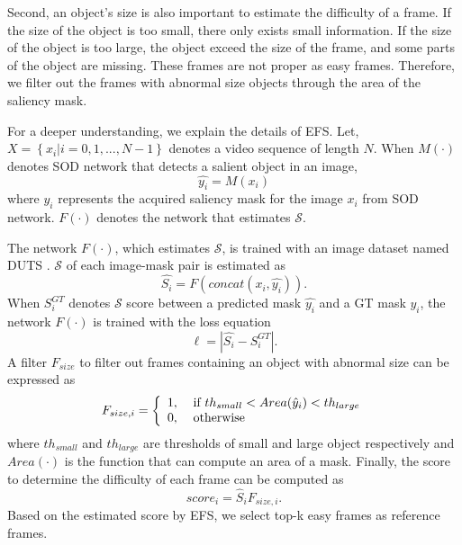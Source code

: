 \documentclass[letterpaper]{article} \usepackage{aaai22}  \usepackage{times}  \usepackage{helvet}  \usepackage{courier}  \usepackage[hyphens]{url}  \usepackage{graphicx} \urlstyle{rm} \def\UrlFont{\rm}  \usepackage{natbib}  \usepackage{caption} \DeclareCaptionStyle{ruled}{labelfont=normalfont,labelsep=colon,strut=off} \frenchspacing  \setlength{\pdfpagewidth}{8.5in}  \setlength{\pdfpageheight}{11in}  \usepackage{algorithm}
\begin{document}
Second, an object’s size is also important to estimate the difficulty of a frame. If the size of the object is too small, there only exists small information. If the size of the object is too large, the object exceed the size of the frame, and some parts of the object are missing. These frames are not proper as easy frames. Therefore, we filter out the frames with abnormal size objects through the area of the saliency mask. 

For a deeper understanding, we explain the details of EFS. Let, $X = \left\{ {{x_i}\left| {i = 0,1,...,N - 1} \right.} \right\}$ denotes a video sequence of length $N$. When $M\left(  \cdot  \right)$ denotes SOD network that detects a salient object in an image, 
\begin{equation}
    \widehat {{y_i}} = M\left( {{x_i}} \right)
    \label{equation1}
\end{equation}
where $\widehat {{y_i}}$ represents the acquired saliency mask for the image ${x_i}$ from SOD network. $F\left(  \cdot  \right)$ denotes the network that estimates $\mathcal{S}$.


The network $F\left(  \cdot  \right)$, which estimates $\mathcal{S}$, is trained with an image dataset named DUTS \citep{wang2017learning}. $\mathcal{S}$ of each image-mask pair is estimated as 
\begin{equation}
    \widehat {{S_i}} = F\left( {concat\left( {{x_i},\widehat {{y_i}}} \right)} \right).
    \label{equation2}
\end{equation}
When $S_i^{GT}$ denotes $\mathcal{S}$ score between a predicted mask $\widehat {{y_i}}$ and a GT mask ${y_i}$, the network $F\left(  \cdot  \right)$ is trained with the loss equation
\begin{equation}
    \ell  = \left| {\widehat {{S_i}} - S_i^{GT}} \right|.
    \label{equation3}
\end{equation}
A filter ${F_{size}}$ to filter out frames containing an object with abnormal size can be expressed as
\begin{equation}
    {F_{size,i}} = \left\{ {\begin{array}{*{20}{l}}
{1,}\\
{0,}
\end{array}} \right.{\rm{      }}\begin{array}{*{20}{l}}
{{\textrm{if }} t{h_{small}} < Area({{\hat y}_i}) < t{h_{large}}}\\
\textrm{otherwise}
\end{array}
\label{equation4}
\end{equation}
where $t{h_{small}}$ and $t{h_{large}}$ are thresholds of small and large object respectively and $Area( \cdot )$ is the function that can compute an area of a mask. Finally, the score to determine the difficulty of each frame can be computed as
\begin{equation}
    scor{e_i} = \hat S{}_i {F_{size,i}}.
    \label{equation5}
\end{equation}
Based on the estimated score by EFS, we select top-k easy frames as reference frames.
\end{document}
